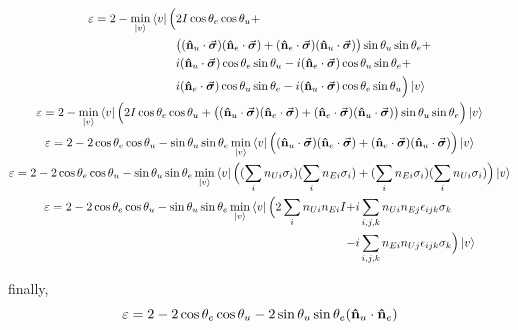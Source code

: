 \documentclass[11pt]{article}
\begin{document}
\begin{gather*}
\begin{align*}
\varepsilon = 2 - \min_{\ket{v}} \bra{v} \Big( &
2 I \cos\theta_e\cos\theta_u + \\ &
\big(
(\vu{n}_u \cdot \va*{\sigma}) (\vu{n}_e \cdot \va*{\sigma}) +
(\vu{n}_e \cdot \va*{\sigma}) (\vu{n}_u \cdot \va*{\sigma})\big) \sin\theta_u\sin\theta_e + \\ 
& i(\vu{n}_u \cdot \va*{\sigma})\cos\theta_e\sin\theta_u  -
i(\vu{n}_e \cdot \va*{\sigma})\cos\theta_u\sin\theta_e + \\
& i(\vu{n}_e \cdot \va*{\sigma})\cos\theta_u\sin\theta_e  -
i(\vu{n}_u \cdot \va*{\sigma})\cos\theta_e\sin\theta_u
\Big) \ket{v}
\end{align*} \\
\begin{align*}
\varepsilon = 2 - \min_{\ket{v}} \bra{v} \Big(
2 I \cos\theta_e\cos\theta_u + 
\big(
(\vu{n}_u \cdot \va*{\sigma}) (\vu{n}_e \cdot \va*{\sigma}) +
(\vu{n}_e \cdot \va*{\sigma}) (\vu{n}_u \cdot \va*{\sigma})\big) \sin\theta_u\sin\theta_e \Big) \ket{v}
\end{align*} \\
\begin{align*}
\varepsilon = 2 - 2 \cos\theta_e \cos\theta_u - \sin\theta_u\sin\theta_e \min_{\ket{v}} \bra{v} \Big(
(\vu{n}_u \cdot \va*{\sigma}) (\vu{n}_e \cdot \va*{\sigma}) +
(\vu{n}_e \cdot \va*{\sigma}) (\vu{n}_u \cdot \va*{\sigma})\Big) \ket{v}
\end{align*} \\
\begin{align*}
\varepsilon = 2 - 2 \cos\theta_e \cos\theta_u - \sin\theta_u\sin\theta_e \min_{\ket{v}} \bra{v} \Big( (\sum_i n_{Ui} \sigma_i) (\sum_i n_{Ei} \sigma_i) + (\sum_i n_{Ei} \sigma_i) (\sum_i n_{Ui} \sigma_i) \Big) \ket{v}
\end{align*} \\
\begin{align*}
\varepsilon = 2 - 2 \cos\theta_e \cos\theta_u - \sin\theta_u\sin\theta_e \min_{\ket{v}} \bra{v} \Big(2\sum_i n_{Ui}n_{Ei} I + & i\sum_{i,j,k} n_{Ui} n_{Ej} \epsilon_{ijk}  \sigma_k \\ - & i\sum_{i,j,k} n_{Ei} n_{Uj} \epsilon_{ijk} \sigma_k \Big) \ket{v}
\end{align*} \\
\end{gather*}

finally,
\begin{equation}
\varepsilon = 2 - 2 \cos\theta_e \cos\theta_u - 2\sin\theta_u\sin\theta_e (\vu{n}_u\cdot \vu{n}_e)
\end{equation}
\end{document}
